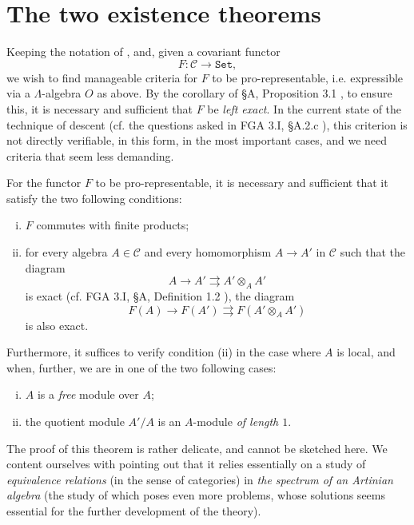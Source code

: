 \section{The two existence theorems}\label{fga3.ii-b}


Keeping the notation of , and, given a covariant functor
\[
F\colon \mathcal{C} \to \mathtt{Set},
\]
we wish to find manageable criteria for $F$ to be pro-representable, i.e. expressible via a $\Lambda$-algebra $O$ as above.
By the corollary of §A, Proposition 3.1 , to ensure this, it is necessary and sufficient that $F$ be \emph{left exact}.
In the current state of the technique of descent (cf. the questions asked in FGA 3.I, §A.2.c ), this criterion is not directly verifiable, in this form, in the most important cases, and we need criteria that seem less demanding.

\begin{theorem}\label{fga3.ii-b-theorem-1}
    For the functor $F$ to be pro-representable, it is necessary and sufficient that it satisfy the two following conditions:
    \begin{enumerate}[i.]
        \item $F$ commutes with finite products;
        \item for every algebra $A\in\mathcal{C}$ and every homomorphism $A\to A'$ in $\mathcal{C}$ such that the diagram
              \[
              A \to A' \rightrightarrows A'\otimes_A A'
              \]
              is exact (cf. FGA 3.I, §A, Definition 1.2 ), the diagram
              \[
              F(A) \to F(A') \rightrightarrows F(A'\otimes_A A')
              \]
              is also exact.
    \end{enumerate}
    Furthermore, it suffices to verify condition (ii) in the case where $A$ is local, and when, further, we are in one of the two following cases:
    \begin{enumerate}[i.]
        \item $A$ is a \emph{free} module over $A$;
        \item the quotient module $A'/A$ is an $A$-module \emph{of length $1$}.
    \end{enumerate}
\end{theorem}


\begin{cproof}
    The proof of this theorem is rather delicate, and cannot be sketched here.
    We content ourselves with pointing out that it relies essentially on a study of \emph{equivalence relations} (in the sense of categories) in \emph{the spectrum of an Artinian algebra} (the study of which poses even more problems, whose solutions seems essential for the further development of the theory).
\end{cproof}


